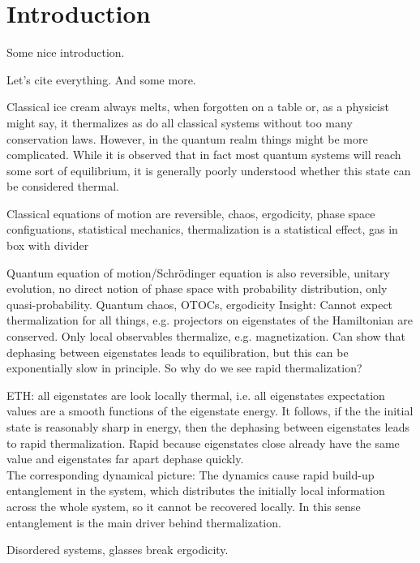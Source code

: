 \chapter{Introduction}\label{ch:introduction}
Some nice introduction.

Let's cite everything\cite{braemerPairLocalizationDipolar2022,eulerMetronomeSpinStabilizes2024,franzEmergentPairLocalization2022,franzObservationUniversalRelaxation2023,geierTimereversalDipolarQuantum2024,braemerClusterTruncatedWigner2024}. And some more\cite{luitzHowSmallQuantum2017,nandkishoreManyBodyLocalized2017}.

Classical ice cream always melts, when forgotten on a table or, as a physicist might say, it thermalizes as do all classical systems without too many conservation laws. However, in the quantum realm things might be more complicated. While it is observed that in fact most quantum systems will reach some sort of equilibrium, it is generally poorly understood whether this state can be considered thermal.  

Classical equations of motion are reversible, chaos, ergodicity, phase space configuations, statistical mechanics, thermalization is a statistical effect, gas in box with divider

Quantum equation of motion/Schrödinger equation is also reversible, unitary evolution, no direct notion of phase space with probability distribution, only quasi-probability. 
Quantum chaos, OTOCs, ergodicity
Insight: Cannot expect thermalization for all things, e.g. projectors on eigenstates of the Hamiltonian are conserved. Only local observables thermalize, e.g. magnetization.
Can show that dephasing between eigenstates leads to equilibration, but this can be exponentially slow in principle. So why do we see rapid thermalization?

ETH: all eigenstates are look locally thermal, i.e. all eigenstates expectation values are a smooth functions of the eigenstate energy. It follows, if the the initial state is reasonably sharp in energy, then the dephasing between eigenstates leads to rapid thermalization. Rapid because eigenstates close already have the same value and eigenstates far apart dephase quickly.\\
The corresponding dynamical picture: The dynamics cause rapid build-up entanglement in the system, which distributes the initially local information across the whole system, so it cannot be recovered locally. In this sense entanglement is the main driver behind thermalization.

Disordered systems, glasses break ergodicity.

